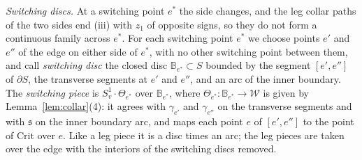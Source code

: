 \emph{Switching discs.} At a switching point $e^*$ the side changes, and the leg collar paths of the two sides end (iii) with
$z_1$ of opposite signs, so they do not form a continuous family across $e^*$. For each switching point $e^*$ we choose points
$e'$ and $e''$ of the edge on either side of $e^*$, with no other switching point between them, and call \emph{switching disc}
the closed disc $\mathbb B_{e^*}\subset S$ bounded by the segment $[e',e'']$ of $\partial S$, the transverse segments at $e'$ and
$e''$, and an arc of the inner boundary. The \emph{switching piece} is $S^1_v\cdot\Theta_{e^*}$ over $\mathbb B_{e^*}$, where
$\Theta_{e^*}\colon\mathbb B_{e^*}\to \mathscr W$ is given by Lemma~\ref{lem:collar}(4): it agrees with $\gamma_{e'}$ and $\gamma_{e''}$
on the transverse segments and with $\mathfrak s$ on the inner boundary arc, and maps each point $e$ of $[e',e'']$ to the point of
$\mathrm{Crit}$ over $e$. Like a leg piece it is a disc times an arc; the leg pieces are taken over the edge with the interiors
of the switching discs removed.

